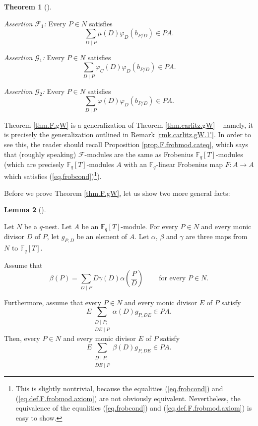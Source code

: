 \documentclass[numbers=enddot,12pt,final,onecolumn,notitlepage]{scrartcl}%
\theoremstyle{definition}
\newtheorem{theo}{Theorem}[section]
\newenvironment{theorem}[1][]
{\begin{theo}[#1]\begin{leftbar}}
{\end{leftbar}\end{theo}}
\newtheorem{lem}[theo]{Lemma}
\newenvironment{lemma}[1][]
{\begin{lem}[#1]\begin{leftbar}}
{\end{leftbar}\end{lem}}
\let\sumnonlimits\sum
\renewcommand{\sum}{\sumnonlimits\limits}
\begin{document}
\begin{theorem}
\textit{Assertion }$\mathcal{F}_{1}$\textit{:} Every $P\in N$ satisfies%
\[
\sum_{D\mid P}\mu\left(  D\right)  \varphi_{D}\left(  b_{P / D}\right)  \in
PA.
\]


\textit{Assertion }$\mathcal{G}_{1}$\textit{:} Every $P\in N$ satisfies%
\[
\sum_{D\mid P}\varphi_{C}\left(  D\right)  \varphi_{D}\left(  b_{P /
D}\right)  \in PA.
\]


\textit{Assertion }$\mathcal{G}_{2}$\textit{:} Every $P\in N$ satisfies%
\[
\sum_{D\mid P}\varphi\left(  D\right)  \varphi_{D}\left(  b_{P/D}\right)  \in
PA.
\]

\end{theorem}

Theorem \ref{thm.F.gW} is a generalization of Theorem \ref{thm.carlitz.gW} --
namely, it is precisely the generalization outlined in Remark
\ref{rmk.carlitz.gW.1'}. In order to see this, the reader should recall
Proposition \ref{prop.F.frobmod.cateq}, which says that (roughly speaking)
$\mathcal{F}$-modules are the same as Frobenius $\mathbb{F}_{q}\left[
T\right]  $-modules (which are precisely $\mathbb{F}_{q}\left[  T\right]
$-modules $A$ with an $\mathbb{F}_{q}$-linear Frobenius map $F:A\rightarrow A$
which satisfies (\ref{eq.frobcond})\footnote{This is slightly nontrivial,
because the equalities (\ref{eq.frobcond}) and (\ref{eq.def.F.frobmod.axiom})
are not obviously equivalent. Nevertheless, the equivalence of the equalities
(\ref{eq.frobcond}) and (\ref{eq.def.F.frobmod.axiom}) is easy to show.}).

Before we prove Theorem \ref{thm.F.gW}, let us show two more general facts:

\begin{lemma}
\label{lem.F.gW.F-G-gen0}Let $N$ be a $q$-nest. Let $A$ be an $\mathbb{F}%
_{q}\left[  T\right]  $-module. For every $P\in N$ and every monic divisor $D$
of $P$, let $g_{P,D}$ be an element of $A$. Let $\alpha$, $\beta$ and $\gamma$
are three maps from $N$ to $\mathbb{F}_{q}\left[  T\right]  $.

Assume that
\begin{equation}
\beta\left(  P\right)  =\sum_{D\mid P}D\gamma\left(  D\right)  \alpha\left(
\dfrac{P}{D}\right)  \ \ \ \ \ \ \ \ \ \ \text{for every }P\in N.
\label{eq.lem.F.gW.F-gen0.beta-through-alpha}%
\end{equation}


Furthermore, assume that every $P\in N$ and every monic divisor $E$ of $P$
satisfy%
\begin{equation}
E\sum_{\substack{D\mid P;\\DE\mid P}}\alpha\left(  D\right)  g_{P,DE}\in PA.
\label{eq.lem.F.gW.F-G-gen0.ass}%
\end{equation}
Then, every $P\in N$ and every monic divisor $E$ of $P$ satisfy%
\begin{equation}
E\sum_{\substack{D\mid P;\\DE\mid P}}\beta\left(  D\right)  g_{P,DE}\in PA.
\label{eq.lem.F.gW.F-G-gen0.claim}%
\end{equation}

\end{lemma}
\end{document}
